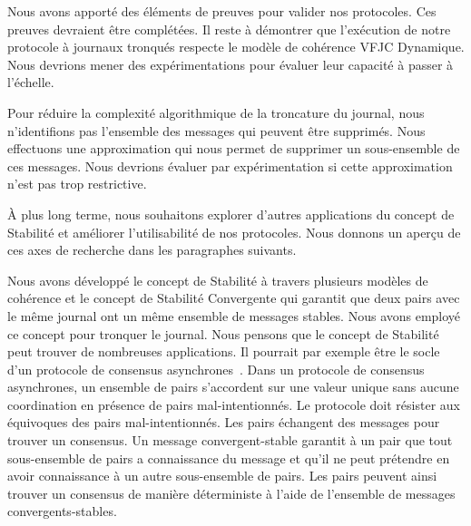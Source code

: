 
Nous avons apporté des éléments de preuves pour valider nos protocoles.
Ces preuves devraient être complétées.
Il reste à démontrer que l'exécution de notre protocole à journaux tronqués respecte le modèle de cohérence \acl{VFJC} Dynamique.
Nous devrions mener des expérimentations pour évaluer leur capacité à passer à l'échelle.

Pour réduire la complexité algorithmique de la troncature du journal, nous n'identifions pas l'ensemble des messages qui peuvent être supprimés.
Nous effectuons une approximation qui nous permet de supprimer un sous-ensemble de ces messages.
Nous devrions évaluer par expérimentation si cette approximation n'est pas trop restrictive.

À plus long terme, nous souhaitons explorer d'autres applications du concept de Stabilité et améliorer l'utilisabilité de nos protocoles.
Nous donnons un aperçu de ces axes de recherche dans les paragraphes suivants.

Nous avons développé le concept de Stabilité à travers plusieurs modèles de cohérence et le concept de Stabilité Convergente qui garantit que deux pairs avec le même journal ont un même ensemble de messages stables.
Nous avons employé ce concept pour tronquer le journal.
Nous pensons que le concept de Stabilité peut trouver de nombreuses applications.
Il pourrait par exemple être le socle d'un protocole de consensus asynchrones~\autocite{bracha1985asynchronous}.
Dans un protocole de consensus asynchrones, un ensemble de pairs s'accordent sur une valeur unique sans aucune coordination en présence de pairs mal-intentionnés.
Le protocole doit résister aux équivoques des pairs mal-intentionnés.
Les pairs échangent des messages pour trouver un consensus.
Un message convergent-stable garantit à un pair que tout sous-ensemble de pairs a connaissance du message et qu'il ne peut prétendre en avoir connaissance à un autre sous-ensemble de pairs.
Les pairs peuvent ainsi trouver un consensus de manière déterministe à l'aide de l'ensemble de messages convergents-stables.

